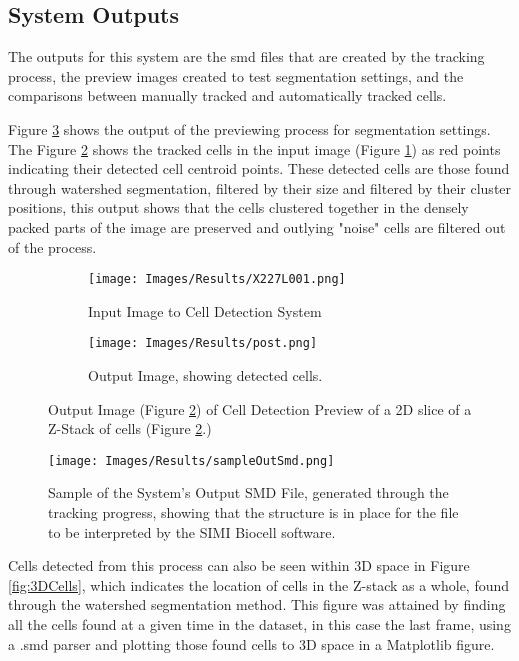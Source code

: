 \documentclass[12pt a4paper]{article}
\begin{document}
\subsection{System Outputs}
The outputs for this system are the smd files that are created by the tracking process, the preview images created to test segmentation settings, and the comparisons between manually tracked and automatically tracked cells.

Figure \ref{fig:resultDetection} shows the output of the previewing process for segmentation settings. The Figure \ref{fig:sub-after} shows the tracked cells in the input image (Figure \ref{fig:sub-before}) as red points indicating their detected cell centroid points. These detected cells are those found through watershed segmentation, filtered by their size and filtered by their cluster positions, this output shows that the cells clustered together in the densely packed parts of the image are preserved and outlying "noise" cells are filtered out of the process.
\begin{figure}
  \centering
  \begin{subfigure}{.5\textwidth}
  \centering
  \texttt{[image: Images/Results/X227L001.png]}
  \caption{Input Image to Cell Detection System}
  \label{fig:sub-before}
\end{subfigure}%
\begin{subfigure}{.5\textwidth}
  \centering
  \texttt{[image: Images/Results/post.png]}
  \caption{Output Image, showing detected cells.}
  \label{fig:sub-after}
\end{subfigure}
  \caption{Output Image (Figure \ref{fig:sub-after}) of Cell Detection Preview of a 2D slice of a Z-Stack of cells (Figure \ref{fig:sub-after}.)}
  \label{fig:resultDetection}
\end{figure}
\begin{figure}
    \centering
    \texttt{[image: Images/Results/sampleOutSmd.png]}
    \caption{Sample of the System's Output SMD File, generated through the tracking progress, showing that the structure is in place for the file to be interpreted by the SIMI Biocell software.}
    \label{fig:sampleOutSmd}
\end{figure}

Cells detected from this process can also be seen within 3D space in Figure \ref{fig:3DCells}, which indicates the location of cells in the Z-stack as a whole, found through the watershed segmentation method. This figure was attained by finding all the cells found at a given time in the dataset, in this case the last frame, using a .smd parser and plotting those found cells to 3D space in a Matplotlib figure.
\end{document}
